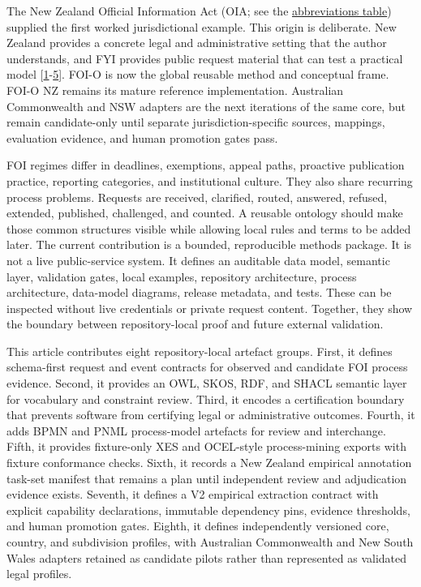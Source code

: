 \documentclass[
]{article}
\begin{document}
The New Zealand Official Information Act (OIA; see the
\hyperlink{tab-abbreviations}{abbreviations table}) supplied the first
worked jurisdictional example. This origin is deliberate. New Zealand
provides a concrete legal and administrative setting that the author
understands, and FYI provides public request material that can test a
practical model {[}\hyperlink{ref-1}{1}-\hyperlink{ref-5}{5}{]}. FOI-O is now the global reusable method and
conceptual frame. FOI-O NZ remains its mature reference implementation.
Australian Commonwealth and NSW adapters are the next iterations of the
same core, but remain candidate-only until separate
jurisdiction-specific sources, mappings, evaluation evidence, and human
promotion gates pass.

FOI regimes differ in deadlines, exemptions, appeal paths, proactive
publication practice, reporting categories, and institutional culture.
They also share recurring process problems. Requests are received,
clarified, routed, answered, refused, extended, published, challenged,
and counted. A reusable ontology should make those common structures
visible while allowing local rules and terms to be added later. The
current contribution is a bounded, reproducible methods package. It is
not a live public-service system. It defines an auditable data model,
semantic layer, validation gates, local examples, repository
architecture, process architecture, data-model diagrams, release
metadata, and tests. These can be inspected without live credentials or
private request content. Together, they show the boundary between
repository-local proof and future external validation.

This article contributes eight repository-local artefact groups. First,
it defines schema-first request and event contracts for observed and
candidate FOI process evidence. Second, it provides an OWL, SKOS, RDF,
and SHACL semantic layer for vocabulary and constraint review. Third, it
encodes a certification boundary that prevents software from certifying
legal or administrative outcomes. Fourth, it adds BPMN and PNML
process-model artefacts for review and interchange. Fifth, it provides
fixture-only XES and OCEL-style process-mining exports with fixture
conformance checks. Sixth, it records a New Zealand empirical annotation
task-set manifest that remains a plan until independent review and
adjudication evidence exists. Seventh, it defines a V2 empirical
extraction contract with explicit capability declarations, immutable
dependency pins, evidence thresholds, and human promotion gates. Eighth,
it defines independently versioned core, country, and subdivision
profiles, with Australian Commonwealth and New South Wales adapters
retained as candidate pilots rather than represented as validated legal
profiles.
\end{document}
